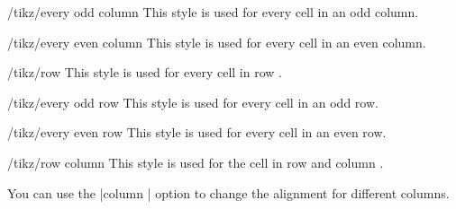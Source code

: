 \begin{stylekey}{/tikz/every odd column}
    This style is used for every cell in an odd column.
\end{stylekey}

\begin{stylekey}{/tikz/every even column}
    This style is used for every cell in an even column.
\end{stylekey}

\begin{stylekey}{/tikz/row }
    This style is used for every cell in row .
\end{stylekey}

\begin{stylekey}{/tikz/every odd row}
    This style is used for every cell in an odd row.
\end{stylekey}

\begin{stylekey}{/tikz/every even row}
    This style is used for every cell in an even row.
\end{stylekey}

\begin{stylekey}{/tikz/row  column }
    This style is used for the cell in row  and column
    .
\end{stylekey}
%
\begin{codeexample}[]
\end{codeexample}

You can use the |column | option to change the alignment for
different columns.
%
\begin{codeexample}[]
\end{codeexample}

